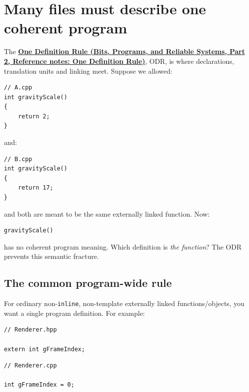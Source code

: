 \section{Many files must describe one coherent program}\label{05-engine-i-ch002-many-files-must-describe-one-coherent-program}

\hypertarget{05-engine-i-ch002-many-files-must-describe-one-coherent-program}{}

The \textbf{\href{../01-Bits-Programs-and-Reliable-Systems-P02/main.pdf\#nameddest=appendix-49d27bc9d9a5}{One Definition Rule (Bits, Programs, and Reliable Systems, Part 2, Reference notes: One Definition Rule)}}, ODR, is where declarations, translation units and linking meet. Suppose we allowed:

\begin{verbatim}
// A.cpp
int gravityScale()
{
    return 2;
}
\end{verbatim}

and:

\begin{verbatim}
// B.cpp
int gravityScale()
{
    return 17;
}
\end{verbatim}

and both are meant to be the same externally linked function. Now:

\begin{verbatim}
gravityScale()
\end{verbatim}

has no coherent program meaning. Which definition is \emph{the function}? The ODR prevents this semantic fracture.

\subsection{The common program-wide rule}\label{05-engine-i-ch002-the-common-program-wide-rule}

\hypertarget{05-engine-i-ch002-the-common-program-wide-rule}{}

For ordinary non-\texttt{inline}, non-template externally linked functions/objects, you want a single program definition. For example:

\begin{verbatim}
// Renderer.hpp

extern int gFrameIndex;
\end{verbatim}

\begin{verbatim}
// Renderer.cpp

int gFrameIndex = 0;
\end{verbatim}

